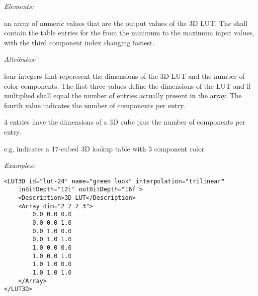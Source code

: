 \emph{Elements:}
\begin{xmlfields}
	\xmlitem[Array][required] 
	an array of numeric values that are the output values of the 3D LUT.  The  shall contain the table entries for the  from the minimum to the maximum input values, with the third component index changing fastest.
    
    \emph{Attributes:}
    \begin{xmlfields}
    	\xmlitem[dim][required] 
    	four integers that reperesent the dimensions of the 3D LUT and the number of color components. The first three values define the dimensions of the LUT and if multiplied shall equal the number of entries actually present in the array. The fourth value indicates the number of components per entry.
    	
    	4 entries have the dimensions of a 3D cube plus the number of components per entry.
		\begin{list}{}{\setlength{\itemsep}{4pt}\setlength{\topsep}{0pt}}
				\item e.g.  indicates a 17-cubed 3D lookup table with 3 component color
		\end{list}
		
    \end{xmlfields}
    

\end{xmlfields}
    	
\emph{Examples:}
\begin{lstlisting}[caption=Example of a simple \xml{LUT3D},label=ex:3dlut]
<LUT3D id="lut-24" name="green look" interpolation="trilinear" 
    inBitDepth="12i" outBitDepth="16f">
	<Description>3D LUT</Description>
	<Array dim="2 2 2 3">
		0.0 0.0 0.0
		0.0 0.0 1.0
		0.0 1.0 0.0
		0.0 1.0 1.0
		1.0 0.0 0.0
		1.0 0.0 1.0
		1.0 1.0 0.0
		1.0 1.0 1.0
	</Array>
</LUT3D>
\end{lstlisting}

